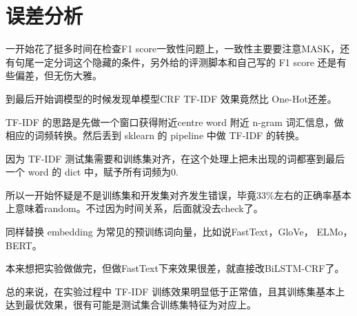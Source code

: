 \section{误差分析}
\label{sec:analysis}

一开始花了挺多时间在检查F1 score一致性问题上，一致性主要要注意MASK，还有句尾一定分词这个隐藏的条件，另外给的评测脚本和自己写的 F1 score 还是有些偏差，但无伤大雅。

到最后开始调模型的时候发现单模型CRF TF-IDF 效果竟然比 One-Hot还差。

TF-IDF 的思路是先做一个窗口获得附近centre word 附近 n-gram 词汇信息，做相应的词频转换。然后丢到 sklearn 的 pipeline 中做 TF-IDF 的转换。

因为 TF-IDF 测试集需要和训练集对齐，在这个处理上把未出现的词都塞到最后一个 word 的 dict 中，赋予所有词频为0.

所以一开始怀疑是不是训练集和开发集对齐发生错误，毕竟33\%左右的正确率基本上意味着random。不过因为时间关系，后面就没去check了。

同样替换 embedding 为常见的预训练词向量，比如说FastText，GloVe， ELMo， BERT。

本来想把实验做做完，但做FastText下来效果很差，就直接改BiLSTM-CRF了。

总的来说，在实验过程中 TF-IDF 训练效果明显低于正常值，且其训练集基本上达到最优效果，很有可能是测试集合训练集特征为对应上。
